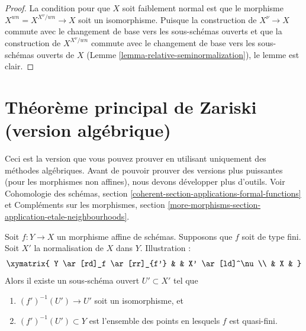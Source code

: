 \begin{proof}
La condition pour que $X$ soit faiblement normal est que
le morphisme $X^{wn} = X^{X^\nu/wn} \to X$ soit un isomorphisme. Puisque la construction de
$X^\nu \to X$ commute avec le changement de base vers les sous-schémas
ouverts et que la construction de $X^{X^\nu/wn}$ commute avec le
changement de base vers les sous-schémas ouverts de $X$ (Lemme \ref{lemma-relative-seminormalization}), le
lemme est clair.
\end{proof}










\section{Théorème principal de Zariski (version algébrique)}
\label{section-Zariski}

\noindent
Ceci est la version que vous pouvez prouver en utilisant uniquement
des méthodes algébriques. Avant de pouvoir prouver des versions
plus puissantes (pour les morphismes non affines), nous
devons développer plus d'outils. Voir Cohomologie
des
schémas, section \ref{coherent-section-applications-formal-functions}
et Compléments sur les morphismes, section \ref{more-morphisms-section-application-etale-neighbourhoods}.

\begin{theorem}
\label{theorem-main-theorem}
Soit $f : Y \to X$ un morphisme affine de schémas. Supposons que $f$
soit de type fini. Soit $X'$
la normalisation de $X$ dans $Y$. Illustration :
$$
\xymatrix{
Y \ar[rd]_f \ar[rr]_{f'} & & X' \ar[ld]^\nu \\
& X &
}
$$
Alors il existe un sous-schéma ouvert $U' \subset X'$ tel que
\begin{enumerate}
\item $(f')^{-1}(U') \to U'$ soit un isomorphisme, et
\item $(f')^{-1}(U') \subset Y$ est l'ensemble des points en lesquels $f$
est quasi-fini.
\end{enumerate}
\end{theorem}


